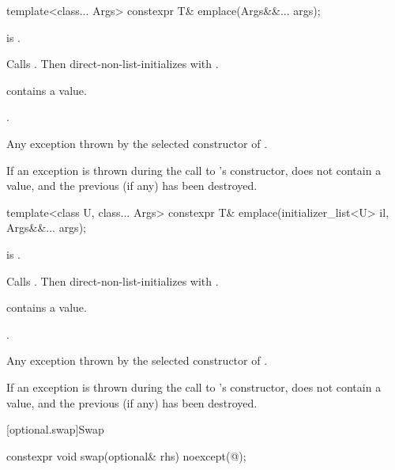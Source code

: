 %
\begin{itemdecl}
template<class... Args>
  constexpr T& emplace(Args&&... args);
\end{itemdecl}

\begin{itemdescr}
\pnum
\mandates
{} is .

\pnum
\effects
Calls . Then direct-non-list-initializes  with .

\pnum
\ensures
{} contains a value.

\pnum
\returns
{}.

\pnum
\throws
Any exception thrown by the selected constructor of .

\pnum
\remarks
If an exception is thrown during the call to 's constructor,  does not contain a value, and the previous  (if any) has been destroyed.
\end{itemdescr}

%
\begin{itemdecl}
template<class U, class... Args>
  constexpr T& emplace(initializer_list<U> il, Args&&... args);
\end{itemdecl}

\begin{itemdescr}
\pnum
\mandates
{} is .

\pnum
\effects
Calls . Then direct-non-list-initializes  with .

\pnum
\ensures
{} contains a value.

\pnum
\returns
{}.

\pnum
\throws
Any exception thrown by the selected constructor of .

\pnum
\remarks
If an exception is thrown during the call to 's constructor,  does not contain a value, and the previous  (if any) has been destroyed.
\end{itemdescr}

[optional.swap]{Swap}

%
\begin{itemdecl}
constexpr void swap(optional& rhs) noexcept(@\seebelow@);
\end{itemdecl}

